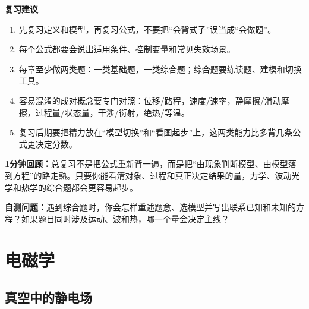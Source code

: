 \documentclass[lang=cn,11pt]{elegantbook}
\newcommand{\summaryline}[1]{\par\noindent\textbf{1分钟回顾：}#1\par}
\newcommand{\chapterselfcheck}[1]{\par\noindent\textbf{自测问题：}#1\par}
\begin{document}
\textbf{复习建议}

\begin{remark}
\begin{enumerate}
 \item 先复习定义和模型，再复习公式，不要把“会背式子”误当成“会做题”。
 \item 每个公式都要会说出适用条件、控制变量和常见失效场景。
 \item 每章至少做两类题：一类基础题，一类综合题；综合题要练读题、建模和切换工具。
 \item 容易混淆的成对概念要专门对照：位移/路程，速度/速率，静摩擦/滑动摩擦，过程量/状态量，干涉/衍射，绝热/等温。
 \item 复习后期要把精力放在“模型切换”和“看图起步”上，这两类能力比多背几条公式更决定分数。
\end{enumerate}
\end{remark}

\summaryline{总复习不是把公式重新背一遍，而是把“由现象判断模型、由模型落到方程”的路走熟。只要你能看清对象、过程和真正决定结果的量，力学、波动光学和热学的综合题都会更容易起步。}
\chapterselfcheck{遇到综合题时，你会怎样重述题意、选模型并写出联系已知和未知的方程？如果题目同时涉及运动、波和热，哪一个量会决定主线？}

\part{电磁学}

\chapter{真空中的静电场}
\end{document}
